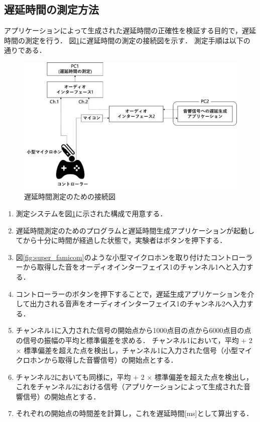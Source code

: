 \subsection{遅延時間の測定方法}
アプリケーションによって生成された遅延時間の正確性を検証する目的で，遅延時間の測定を行う．
図\ref{fig:delay_check}に遅延時間の測定の接続図を示す．
測定手順は以下の通りである．
\begin{figure}[tb]
  \centering
  \includegraphics[scale=0.14]{figures/DelayCheck/DelayCheck_EX.pdf}
  \caption{遅延時間測定のための接続図}
  \label{fig:delay_check}
\end{figure}
\begin{enumerate}[leftmargin=*]
  \item 測定システムを図\ref{fig:delay_check}に示された構成で用意する．
  \item 遅延時間測定のためのプログラムと遅延時間生成アプリケーションが起動してから十分に時間が経過した状態で，実験者はボタンを押下する．
  \item 図\ref{fig:super_famicom}のような小型マイクロホンを取り付けたコントローラーから取得した音をオーディオインターフェイス1のチャンネル1へと入力する．
  \item コントローラーのボタンを押下することで，遅延生成アプリケーションを介して出力される音声をオーディオインターフェイス1のチャンネル2へ入力する．
  \item チャンネル1に入力された信号の開始点から1000点目の点から6000点目の点の信号の振幅の平均と標準偏差を求める．
  チャンネル1において，平均 + 2 × 標準偏差を超えた点を検出し，チャンネル1に入力された信号（小型マイクロホンから取得した音響信号）の開始点とする．
  \item チャンネル2においても同様に，平均 + 2 × 標準偏差を超えた点を検出し，
  これをチャンネル2における信号（アプリケーションによって生成された音響信号）の開始点とする．
  \item それぞれの開始点の時間差を計算し，これを遅延時間[ms]として算出する．
\end{enumerate}
